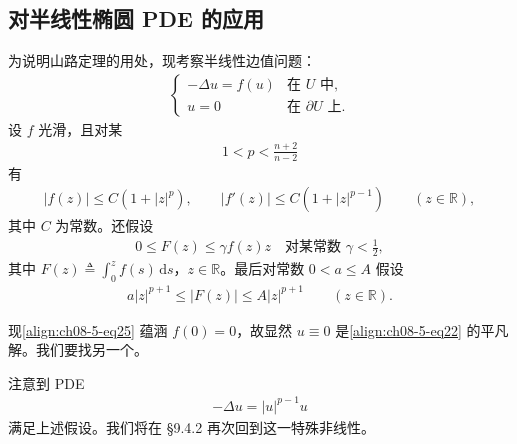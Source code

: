 \documentclass[../../main.tex]{subfiles}
\begin{document}
\subsection{对半线性椭圆 PDE 的应用}\label{subsection:ch08-5-2-半线性椭圆}

为说明山路定理的用处，现考察半线性边值问题：
\begin{align}
\begin{cases}
-\Delta u=f(u)&\text{在 }U\text{ 中},\\
u=0&\text{在 }\partial U\text{ 上}.
\end{cases}\label{align:ch08-5-eq22}
\end{align}
设 $f$ 光滑，且对某
\begin{align*}
1<p<\frac{n+2}{n-2}
\end{align*}
有
\begin{align}
|f(z)|\leqslant C(1+|z|^p),\qquad |f'(z)|\leqslant C(1+|z|^{p-1})\qquad (z\in\mathbb{R}),\label{align:ch08-5-eq23}
\end{align}
其中 $C$ 为常数。还假设
\begin{align}
0\leqslant F(z)\leqslant\gamma f(z)z\quad\text{对某常数 }\gamma<\frac12,\label{align:ch08-5-eq24}
\end{align}
其中 $F(z)\triangleq\int_0^z f(s)\,\mathrm{d}s$，$z\in\mathbb{R}$。最后对常数 $0<a\leqslant A$ 假设
\begin{align}
a|z|^{p+1}\leqslant|F(z)|\leqslant A|z|^{p+1}\qquad (z\in\mathbb{R}).\label{align:ch08-5-eq25}
\end{align}

现\eqref{align:ch08-5-eq25} 蕴涵 $f(0)=0$，故显然 $u\equiv 0$ 是\eqref{align:ch08-5-eq22} 的平凡解。我们要找另一个。

注意到 PDE
\begin{align*}
-\Delta u=|u|^{p-1}u
\end{align*}
满足上述假设。我们将在 \S9.4.2 再次回到这一特殊非线性。
\end{document}

